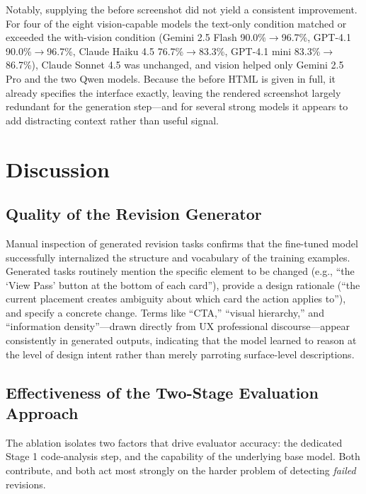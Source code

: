 \documentclass[sigconf,nonacm]{acmart}
\begin{document}
Notably, supplying the before screenshot did not yield a consistent improvement. For four of the eight vision-capable models the text-only condition matched or exceeded the with-vision condition (Gemini 2.5 Flash 90.0\%$\rightarrow$96.7\%, GPT-4.1 90.0\%$\rightarrow$96.7\%, Claude Haiku 4.5 76.7\%$\rightarrow$83.3\%, GPT-4.1 mini 83.3\%$\rightarrow$86.7\%), Claude Sonnet 4.5 was unchanged, and vision helped only Gemini 2.5 Pro and the two Qwen models. Because the before HTML is given in full, it already specifies the interface exactly, leaving the rendered screenshot largely redundant for the generation step—and for several strong models it appears to add distracting context rather than useful signal.

\section{Discussion}
\label{sec:discussion}

\subsection{Quality of the Revision Generator}

Manual inspection of generated revision tasks confirms that the fine-tuned model successfully internalized the structure and vocabulary of the training examples. Generated tasks routinely mention the specific element to be changed (e.g., ``the `View Pass' button at the bottom of each card''), provide a design rationale (``the current placement creates ambiguity about which card the action applies to''), and specify a concrete change. Terms like ``CTA,'' ``visual hierarchy,'' and ``information density''—drawn directly from UX professional discourse—appear consistently in generated outputs, indicating that the model learned to reason at the level of design intent rather than merely parroting surface-level descriptions.

\subsection{Effectiveness of the Two-Stage Evaluation Approach}

The ablation isolates two factors that drive evaluator accuracy: the dedicated Stage 1 code-analysis step, and the capability of the underlying base model. Both contribute, and both act most strongly on the harder problem of detecting \emph{failed} revisions.
\end{document}
